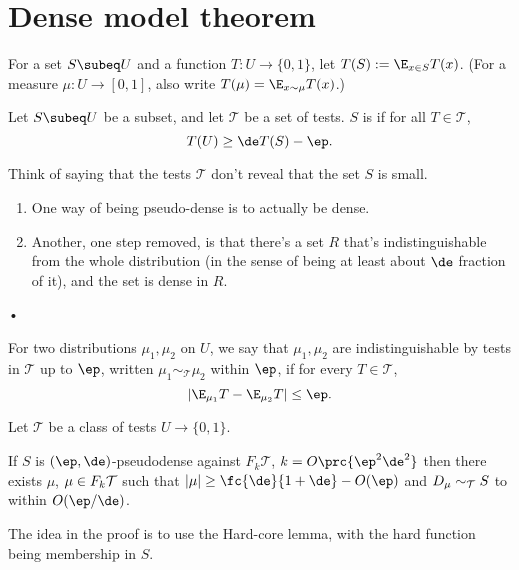 \section{Dense model theorem}

\begin{df}
For a set $S\subeq U$ and a function $T:U \to \{0,1\}$,  let $T(S):=\E_{x\in S} T(x)$. (For a measure $\mu: U\to [0,1]$, also write $T(\mu) = \E_{x\sim \mu} T(x)$.)

Let $S\subeq U$ be a subset, and let $\mathcal T$ be a set of tests. $S$ is  if for all $T\in \mathcal T$, 
$$
T(U) \ge \de T(S)-\ep.
$$
\end{df}
Think of saying that the tests $\mathcal T$ don't reveal that the set $S$ is small. 
\begin{enumerate}
\item
One way of being pseudo-dense is to actually be dense.
\item
Another, one step removed, is that there's a set $R$ that's indistinguishable from the whole distribution (in the sense of being at least about $\de$ fraction of it), and the set is dense in $R$.
\end{enumerate}•
\begin{df}
For two distributions $\mu_1,\mu_2$ on $U$, we say that $\mu_1,\mu_2$ are indistinguishable by tests in  $\mathcal T$ up to $\ep$, written $\mu_1 \sim_{\mathcal T} \mu_2$ within $\ep$, if for every $T\in \mathcal T$, 
$$
|\E_{\mu_1}T - \E_{\mu_2} T| \le \ep.
$$
\end{df}
\begin{thm}\label{thm:dmt}
Let $\mathcal T$ be a class of tests $U\to \{0,1\}$. 

If $S$ is $(\ep,\de)$-pseudodense against $F_k\mathcal T$, $k=O\prc{\ep^2\de^2}$ then there exists $\mu$, $\mu\in F_k\cal T$ such that $|\mu|\ge \fc{\de}{1+\de}-O(\ep)$ and $D_\mu\sim_{\cal T} S$ to within $O(\ep/\de)$. 
\end{thm}
The idea in the proof is to use the Hard-core lemma, with the hard function being membership in $S$.

